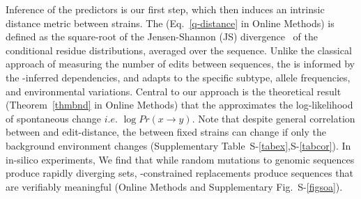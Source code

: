 \documentclass[onecolumn, compsoc,10pt]{IEEEtran}
\def\SUPPLEMENTARY{Supplementary\xspace}
\def\METHODS{Online Methods\xspace}
\begin{document}
Inference of the \enet predictors is our first step, which then induces  an intrinsic distance metric between strains. The \qdist  (Eq.~\eqref{q-distance} in \METHODS) is defined as the square-root of the Jensen-Shannon (JS) divergence~\cite{cover} of the conditional residue distributions, averaged over the sequence. Unlike the classical approach of measuring the number of edits between sequences, the \qdist is informed by the \enet-inferred  dependencies, and adapts to the specific subtype, allele frequencies, and environmental variations. Central to our approach is the theoretical result (Theorem~\ref{thmbnd} in \METHODS) that the \qdist  approximates the log-likelihood of spontaneous change $i.e.$ $\log Pr(x \rightarrow y )$. Note that despite general correlation between \qdist and edit-distance, the \qdist between fixed strains can change if only the background environment changes (\SUPPLEMENTARY Table~S-\ref{tabex},S-\ref{tabcor}).  In in-silico experiments, We find that while random mutations to genomic sequences produce rapidly diverging sets, \enet-constrained replacements produce sequences that are verifiably meaningful (\METHODS and \SUPPLEMENTARY Fig.~S-\ref{figsoa}).


\end{document}
